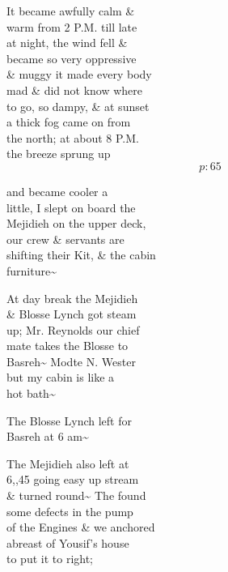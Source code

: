 \documentclass{report}
\begin{document}
	\par{
 	It became awfully calm \&\ \\warm from 2 P.M. till late\ \\at night, the wind fell \&\ \\became so very oppressive\ \\\& muggy it made every body\ \\mad \& did not know where\ \\to go, so dampy, \& at sunset\ \\a thick fog came on from\ \\the north; at about 8 P.M.\ \\the breeze sprung up\ \\
  \[p: 65 \]

	}


	\par{
 	and became cooler a\ \\little, I slept on board the\ \\Mejidieh on the upper deck,\ \\our crew \& servants are\ \\shifting their Kit, \& the cabin\ \\furniture\~{}\ \\
	}

	\par{
 	At day break the Mejidieh\ \\\& Blosse Lynch got steam\ \\up; Mr. Reynolds our chief\ \\mate takes the Blosse to\ \\Basreh\~{} Modte N. Wester\ \\but my cabin is like a\ \\hot bath\~{}\ \\
	}

	\par{
 	The Blosse Lynch left for\ \\Basreh at 6 am\~{}\ \\
	}

	\par{
 	The Mejidieh also left at\ \\6,,45 going easy up stream\ \\\& turned round\~{} The found\ \\some defects in the pump\ \\of the Engines \& we anchored\ \\abreast of Yousif's house\ \\to put it to right;\ \\
	}
\end{document}
